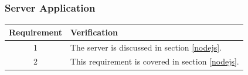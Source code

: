 \subsubsection{Server Application}
\begin{table}[!h]
	\begin{center}
		\begin{tabular}{ | c |  p{12cm} | }
			\hline
			\textbf{Requirement} & \textbf{Verification} \\ \hline
			1 & The server is discussed in section \ref{nodejs}.\\ \hline
			2 & This requirement is covered in section \ref{nodejs}.\\ 
			\hline
		\end{tabular}
	\end{center}
\end{table}
\clearpage